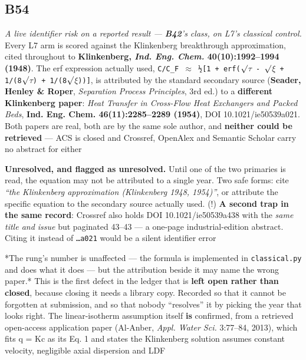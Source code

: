 \documentclass[10pt]{article}
\begin{document}
\subsection*{B54}\label{led:B54}
\begin{description}[leftmargin=0pt,itemsep=1pt]
\item[Defect.] \emph{A live identifier risk on a reported result --- \textbf{B42}'s class, on L7's classical control.} Every L7 arm is scored against the Klinkenberg breakthrough approximation, cited throughout to \textbf{Klinkenberg, \emph{Ind. Eng. Chem.} 40(10):1992--1994 (1948)}. The erf expression actually used, \texttt{C/C\_F $\approx$ ½[1 + erf($\surd$$\tau$ - $\surd$$\xi$ + 1/(8$\surd$$\tau$) + 1/(8$\surd$$\xi$))]}, is attributed by the standard secondary source (\textbf{Seader, Henley \& Roper}, \emph{Separation Process Principles}, 3rd ed.) to a \textbf{different Klinkenberg paper}: \emph{Heat Transfer in Cross-Flow Heat Exchangers and Packed Beds}, \textbf{Ind. Eng. Chem. 46(11):2285--2289 (1954)}, DOI 10.1021/ie50539a021. Both papers are real, both are by the same sole author, and \textbf{neither could be retrieved} --- ACS is closed and Crossref, OpenAlex and Semantic Scholar carry no abstract for either
\item[Resolution.] \textbf{Unresolved, and flagged as unresolved.} Until one of the two primaries is read, the equation may not be attributed to a single year. Two safe forms: cite \emph{``the Klinkenberg approximation (Klinkenberg 1948, 1954)''}, or attribute the specific equation to the secondary source actually used. (!) \textbf{A second trap in the same record}: Crossref also holds DOI 10.1021/ie50539a438 with the \emph{same title and issue} but paginated 43--43 --- a one-page industrial-edition abstract. Citing it instead of \texttt{\ldots{}a021} would be a silent identifier error
\item[Note.] *The rung's number is unaffected --- the formula is implemented in \texttt{classical.py} and does what it does --- but the attribution beside it may name the wrong paper.* This is the first defect in the ledger that is \textbf{left open rather than closed}, because closing it needs a library copy. Recorded so that it cannot be forgotten at submission, and so that nobody ``resolves'' it by picking the year that looks right. The linear-isotherm assumption itself \textbf{is} confirmed, from a retrieved open-access application paper (Al-Anber, \emph{Appl. Water Sci.} 3:77--84, 2013), which fits q = Kc as its Eq. 1 and states the Klinkenberg solution assumes constant velocity, negligible axial dispersion and LDF
\end{description}
\end{document}
